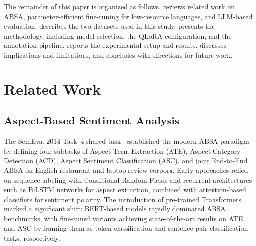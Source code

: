 \documentclass[runningheads]{llncs}
\begin{document}
The remainder of this paper is organized as follows.  reviews related work on ABSA, parameter-efficient fine-tuning for low-resource languages, and LLM-based evaluation.  describes the two datasets used in this study.  presents the methodology, including model selection, the QLoRA configuration, and the annotation pipeline.  reports the experimental setup and results.  discusses implications and limitations, and  concludes with directions for future work.

\section{Related Work}
\label{sec:related_work}

\subsection{Aspect-Based Sentiment Analysis}
\label{sec:rw_absa}

The SemEval-2014 Task~4 shared task~\cite{pontiki2014} established the modern ABSA paradigm by defining four subtasks of Aspect Term Extraction (ATE)\cite{ma-etal-2019-exploring}, Aspect Category Detection (ACD)\cite{hu-etal-2021-multi-label}, Aspect Sentiment Classification (ASC)\cite{10.1145/3721844}, and joint End-to-End ABSA on English restaurant and laptop review corpora\cite{Hua2024}. Early approaches relied on sequence labeling with Conditional Random Fields and recurrent architectures such as BiLSTM networks for aspect extraction, combined with attention-based classifiers for sentiment polarity. The introduction of pre-trained Transformers marked a significant shift: BERT-based models rapidly dominated ABSA benchmarks\cite{ZohrehMadhoushi2019,electronics12030515}, with fine-tuned variants achieving state-of-the-art results on ATE and ASC by framing them as token classification and sentence-pair classification tasks, respectively.
\end{document}
